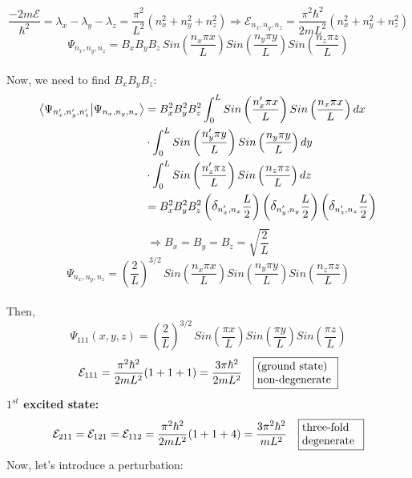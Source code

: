 \documentclass[12pt,fancychapters]{report}
\numberwithin{equation}{section}
\begin{document}
\begin{equation}
  \frac{-2m\mathcal{E}}{\hbar^2} = \lambda_x - \lambda_y - \lambda_z = \frac{\pi^2}{L^2}
  \left(n_x^2 + n_y^2 + n_z^2 \right) \Rightarrow \boxed{\mathcal{E}_{n_x,n_y,n_z} = \frac{\pi^2 \hbar^2}
  {2mL^2}
\left(n_x^2 + n_y^2 + n_z^2\right)}
\end{equation}
\begin{equation}
  \boxed{\Psi_{n_x,n_y,n_z} = B_xB_yB_z\,Sin\left(\frac{n_x \pi x}{L}\right)
  Sin\left(\frac{n_y \pi y}{L}\right)Sin\left(\frac{n_z \pi z}{L}\right)}
\end{equation}
\\
Now, we need to find $B_xB_yB_z$:
\\
\begin{align*}
  \big<\Psi_{n'_x,n'_y,n'_z}\big|\Psi_{n_x,n_y,n_z} \big>& =B^2_xB^2_yB^2_z \int_{0}^{L}
  Sin\left(\frac{n'_x \pi x}{L}\right)Sin\left(\frac{n_x \pi x}{L}\right)dx\\
  & \cdot\int_{0}^{L}
  Sin\left(\frac{n'_y \pi y}{L}\right)Sin\left(\frac{n_y \pi y}{L}\right)dy\\
  & \cdot\int_{0}^{L}
  Sin\left(\frac{n'_z \pi z}{L}\right)Sin\left(\frac{n_z \pi z}{L}\right)dz\\
  &=B^2_xB^2_yB^2_z \left(\mathlarger{\delta}_{n'_x,n_x}\frac{L}{2}\right)
  \left(\mathlarger{\delta}_{n'_y,n_y}\frac{L}{2}\right)
  \left(\mathlarger{\delta}_{n'_z,n_z}\frac{L}{2}\right)
\end{align*}
\[
  \Rightarrow B_x = B_y = B_z = \sqrt{\frac{2}{L}}
\]
\begin{equation}
  \boxed{\Psi_{n_x,n_y,n_z} = \left(\frac{2}{L}\right)^{3/2}\,Sin\left(\frac{n_x \pi x}{L}\right)
  Sin\left(\frac{n_y \pi y}{L}\right)Sin\left(\frac{n_z \pi z}{L}\right) }
\end{equation}
\\
Then, \\
\[
  \Psi_{111}(x,y,z) =\left(\frac{2}{L}\right)^{3/2}\,Sin\left(\frac{\pi x}{L}\right)
  Sin\left(\frac{ \pi y}{L}\right)Sin\left(\frac{ \pi z}{L}\right) 
\]
\[
  \mathcal{E}_{111} = \frac{\pi^2 \hbar^2}{2mL^2}(1+1+1) =\frac{3\pi \hbar^2}{2mL^2}\quad
   \fbox{%
  \parbox{.2\textwidth}{%
    (ground state)\\
  non-degenerate}%
}
\]
\textbf{$1^{st}$ excited state:}
\[
  \mathcal{E}_{211} = \mathcal{E}_{121} = \mathcal{E}_{112} = \frac{\pi^2 \hbar^2}{2mL^2}(1+1+4)
  = \frac{3\pi^2 \hbar^2}{mL^2}\quad \fbox {%
    \parbox{.15\textwidth}{%
three-fold \\
degenerate}%
}
\]
Now, let's introduce a perturbation:\\
\newpage
\end{document}
